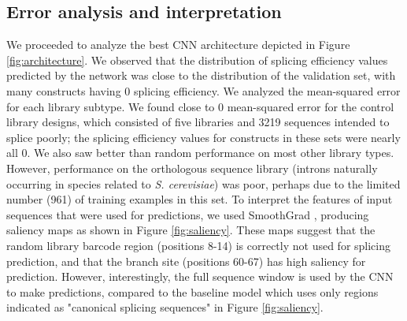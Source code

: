 \documentclass{article}
\begin{document}
\subsection{Error analysis and interpretation}
We proceeded to analyze the best CNN architecture depicted in Figure \ref{fig:architecture}. We observed that the distribution of splicing efficiency values predicted by the network was close to the distribution of the validation set, with many constructs having 0 splicing efficiency. We analyzed the mean-squared error for each library subtype. We found close to 0 mean-squared error for the control library designs, which consisted of five libraries and 3219 sequences intended to splice poorly; the splicing efficiency values for constructs in these sets were nearly all 0. We also saw better than random performance on most other library types. However, performance on the orthologous sequence library (introns naturally occurring in species related to {\it S. cerevisiae}) was poor, perhaps due to the limited number (961) of training examples in this set. To interpret the features of input sequences that were used for predictions, we used SmoothGrad \cite{smoothgrad}, producing saliency maps as shown in Figure \ref{fig:saliency}. These maps suggest that the random library barcode region (positions 8-14) is correctly not used for splicing prediction, and that the branch site (positions 60-67) has high saliency for prediction. However, interestingly, the full sequence window is used by the CNN to make predictions, compared to the baseline model which uses only regions indicated as "canonical splicing sequences" in Figure \ref{fig:saliency}.
\end{document}
